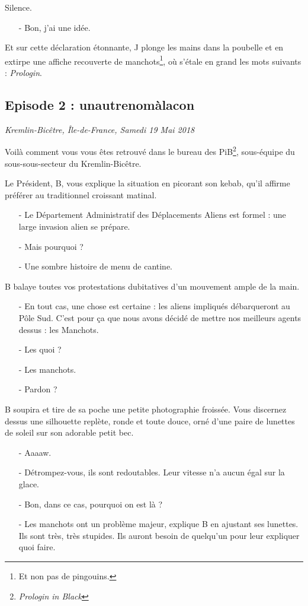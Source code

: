 Silence.

\begin{itemize}
\item[-] Bon, j'ai une idée.
\end{itemize}

Et sur cette déclaration étonnante, J plonge les mains dans la poubelle et en
extirpe une affiche recouverte de manchots\footnote{Et non pas de pingouins.},
où s'étale en grand les mots suivants : \emph{Prologin}.

\subsection{Episode 2 : unautrenomàlacon}
\hfill \textit{Kremlin-Bicêtre, Île-de-France, Samedi 19 Mai 2018}

Voilà comment vous vous êtes retrouvé dans le bureau des
PiB\footnote{\emph{Prologin in Black}\texttrademark}, sous-équipe du
sous-sous-secteur du Kremlin-Bicêtre.

Le Président, B, vous explique la situation en picorant son kebab, qu'il affirme
préférer au traditionnel croissant matinal.

\begin{itemize}
    \item[-] Le Département Administratif des Déplacements Aliens est formel :
        une large invasion alien se prépare.
    \item[-] Mais pourquoi ?
    \item[-] Une sombre histoire de menu de cantine. %
\end{itemize}
B balaye toutes vos protestations dubitatives d'un mouvement ample de la main.
\begin{itemize}
    \item[-] En tout cas, une chose est certaine : les aliens impliqués
        débarqueront au Pôle Sud. C'est pour ça que nous avons décidé de mettre
        nos meilleurs agents dessus : les Manchots.
    \item[-] Les quoi ?
    \item[-] Les manchots.
    \item[-] Pardon ?
\end{itemize}

B soupira et tire de sa poche une petite photographie froissée. Vous discernez
dessus une silhouette replète, ronde et toute douce, orné d'une paire de
lunettes de soleil sur son adorable petit bec.

\begin{itemize}
    \item[-] Aaaaw.
    \item[-] Détrompez-vous, ils sont redoutables. Leur vitesse n'a aucun égal
        sur la glace.
    \item[-] Bon, dans ce cas, pourquoi on est là ?
    \item[-] Les manchots ont un problème majeur, explique B en ajustant ses
        lunettes. Ils sont très, très stupides. Ils auront besoin de quelqu'un
        pour leur expliquer quoi faire.
\end{itemize}


